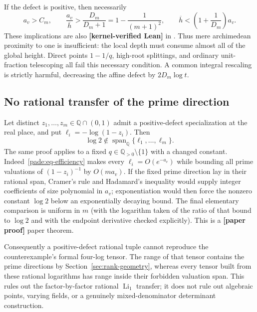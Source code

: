 \documentclass[11pt,oneside]{article}
\theoremstyle{definition}
\theoremstyle{remark}
\newcommand{\Q}{\mathbb Q}
\newcommand{\lean}[1]{\texttt{\detokenize{#1}}}
\newcommand{\statuslean}{\textcolor{leanblue}{\textbf{[kernel-verified Lean]}}}
\newcommand{\statusnew}{\textcolor{newgreen}{\textbf{[paper proof]}}}
\begin{document}
If the defect is positive, then necessarily
\begin{equation}
 a_v>C_m,\qquad
 \frac{a_v}{\overline h}>\frac{D_m}{D_m+1}
 =1-\frac1{(m+1)^2},\qquad
 \overline h<\left(1+\frac1{D_m}\right)a_v.
 \label{pade:eq-efficiency}
\end{equation}
These implications are also \statuslean{} in \lean{ProjectiveDefect}.  Thus mere
archimedean proximity to one is insufficient: the local depth must consume almost all of the
global height.  Direct points $1-1/q$, high-root splittings, and ordinary unit-fraction
telescoping all fail this necessary condition.  A common integral rescaling is strictly
harmful, decreasing the affine defect by $2D_m\log t$.

\subsection{No rational transfer of the prime direction}
\label{pade:rational-transfer}

Let distinct $z_1,\ldots,z_m\in\Q\cap(0,1)$ admit a positive-defect specialization at the
real place, and put $\ell_i=-\log(1-z_i)$.  Then
\begin{equation}
 \log2\notin\operatorname{span}_{\Q}\{\ell_1,\ldots,\ell_m\}.
 \label{pade:eq-no-transfer}
\end{equation}
The same proof applies to a fixed $q\in\Q_{>0}\setminus\{1\}$ with a changed constant.
Indeed~\eqref{pade:eq-efficiency} makes every $\ell_i=O(e^{-a_v})$ while bounding all prime
valuations of $(1-z_i)^{-1}$ by $O(ma_v)$.  If the fixed prime direction lay in their
rational span, Cramer's rule and Hadamard's inequality would supply integer coefficients of
size polynomial in $a_v$; exponentiation would then force the nonzero constant $\log2$ below
an exponentially decaying bound.  The final elementary comparison is uniform in $m$ (with
the logarithm taken of the ratio of that bound to $\log2$ and with the endpoint derivative
checked explicitly).  This is a \statusnew{} paper theorem.

Consequently a positive-defect rational tuple cannot reproduce the counterexample's formal
four-log tensor.  The range of that tensor contains the prime directions by
Section~\ref{sec:rank-geometry}, whereas every tensor built from these rational logarithms has
range inside their forbidden valuation span.  This rules out the factor-by-factor rational
$\operatorname{Li}_1$ transfer; it does not rule out algebraic points, varying fields, or a
genuinely mixed-denominator determinant construction.
\end{document}
